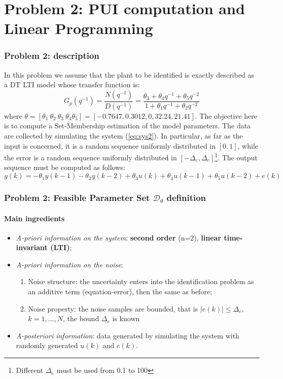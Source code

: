 \documentclass{beamer}
\begin{document}
\section{Problem 2: PUI computation and Linear Programming}
\begin{frame}
    \frametitle{Problem 2: description}
    In this problem we assume that the plant to be identified is exactly described as a DT LTI model whose transfer function is: 
    \begin{equation}\label{eq:sys2}
        G_p(q^{-1}) = \frac{N(q^{-1})}{D(q^{-1})}=
        \frac{\theta_3+\theta_4{q^{-1}}+\theta_5{q^{-2}}}{1+\theta_1{q^{-1}}+\theta_2{q^{-2}}} 
    \end{equation}
    where $\theta=[\theta_1\ \theta_2 \ \theta_3 \ \theta_4  \theta_5 ] = [-0.7647, 0.3012, 0, 32.24, 21.41]$. 
    The objective here is to compute a Set-Membership estimation of the model parameters. The data are collected by simulating the system (\ref{eq:sys2}). In particular, as far as the input is concerned, it is a random sequence uniformly distributed in $[0,1]$, while the error is a random sequence uniformly distributed in $[-\Delta_e, \Delta_e]$\footnote{
        Different $\Delta_e$ must be used from 0.1 to 100
    }.
    The output sequence must be computed as follows: 
    \begin{equation}
        y(k)=-\theta_1{y(k-1)}-\theta_2{y(k-2)}+\theta_3{u(k)}+\theta_4{u(k-1)}+\theta_5{u(k-2)} + e(k)
    \end{equation}
\end{frame}

\begin{frame}
    \frametitle{Problem 2: Feasible Parameter Set $\mathcal{D}_\theta$ definition}
    \framesubtitle{Main ingredients}
    \begin{itemize}
        \item \textit{A-priori information on the system}: \textbf{second order} (n=2), \textbf{linear time-invariant (LTI)}; 
        \item \textit{A-priori information on the noise}: 
        \begin{enumerate}
            \item Noise structure: the uncertainty enters into the identification problem as an additive term (equation-error), then the same as before; 
            \item Noise property: the noise samples are bounded, that is $\vert e(k) \vert \le \Delta_e$, $k=1,...,N$, the bound $\Delta_e$ is known
        \end{enumerate}
        \item \textit{A-posteriori information}: data generated by simulating the system with randomly generated $u(k)$ and $e(k)$.
    \end{itemize}
\end{frame}
\end{document}
